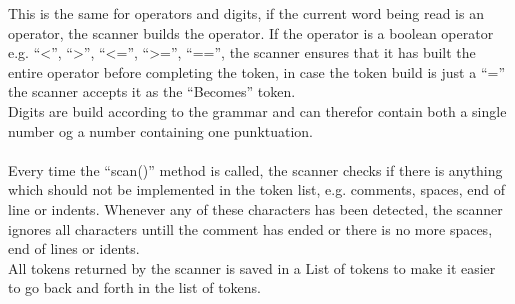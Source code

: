 This is the same for operators and digits, if the current word being read is an operator, the scanner builds the operator. If the operator is a boolean operator e.g. "`<"', "`>"', "`<="', "`>="', "`=="', the scanner ensures that it has built the entire operator before completing the token, in case the token build is just a "`="' the scanner accepts it as the "`Becomes"' token.\\
Digits are build according to the grammar and can therefor contain both a single number og a number containing one punktuation.\\
\\
Every time the "`scan()"' method is called, the scanner checks if there is anything which should not be implemented in the token list, e.g. comments, spaces, end of line or indents. Whenever any of these characters has been detected, the scanner ignores all characters untill the comment has ended or there is no more spaces, end of lines or idents.\\
All tokens returned by the scanner is saved in a List of tokens to make it easier to go back and forth in the list of tokens.\\

